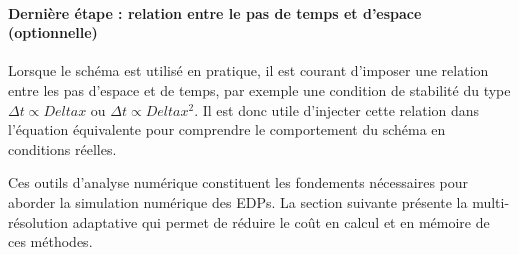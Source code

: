         \paragraph{Dernière étape : relation entre le pas de temps et d'espace (optionnelle)}

        Lorsque le schéma est utilisé en pratique, il est courant d'imposer une relation entre les pas d'espace et de temps, par exemple une condition de stabilité du type
        $\Delta t \propto Delta x$ ou $\Delta t \propto Delta x^2$.
        Il est donc utile d'injecter cette relation dans l'équation équivalente pour comprendre le comportement du schéma en conditions réelles.

        Ces outils d'analyse numérique constituent les fondements nécessaires pour aborder la simulation numérique des EDPs. La section suivante présente la multi-résolution adaptative qui permet de réduire le coût en calcul et en mémoire de ces méthodes.